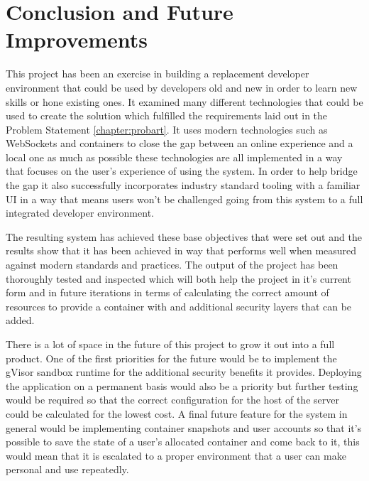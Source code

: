 \documentclass[12pt, a4paper]{extreport}
\begin{document}
\pagebreak


\chapter{Conclusion and Future Improvements} \label{conclusion}


This project has been an exercise in building a replacement developer environment that could be used by developers old and new in order to learn new skills or hone existing ones. It examined many different technologies that could be used to create the solution which fulfilled the requirements laid out in the Problem Statement \ref{chapter:probart}. It uses modern technologies such as WebSockets and containers to close the gap between an online experience and a local one as much as possible these technologies are all implemented in a way that focuses on the user's experience of using the system. In order to help bridge the gap it also successfully incorporates industry standard tooling with a familiar UI in a way that means users won't be challenged going from this system to a full integrated developer environment.

The resulting system has achieved these base objectives that were set out and the results show that it has been achieved in way that performs well when measured against modern standards and practices. The output of the project has been thoroughly tested and inspected which will both help the project in it's current form and in future iterations in terms of calculating the correct amount of resources to provide a container with and additional security layers that can be added.

There is a lot of space in the future of this project to grow it out into a full product. One of the first priorities for the future would be to implement the gVisor sandbox runtime for the additional security benefits it provides. Deploying the application on a permanent basis would also be a priority but further testing would be required so that the correct configuration for the host of the server could be calculated for the lowest cost. A final future feature for the system in general would be implementing container snapshots and user accounts so that it's possible to save the state of a user's allocated container and come back to it, this would mean that it is escalated to a proper environment that a user can make personal and use repeatedly. 
\end{document}
